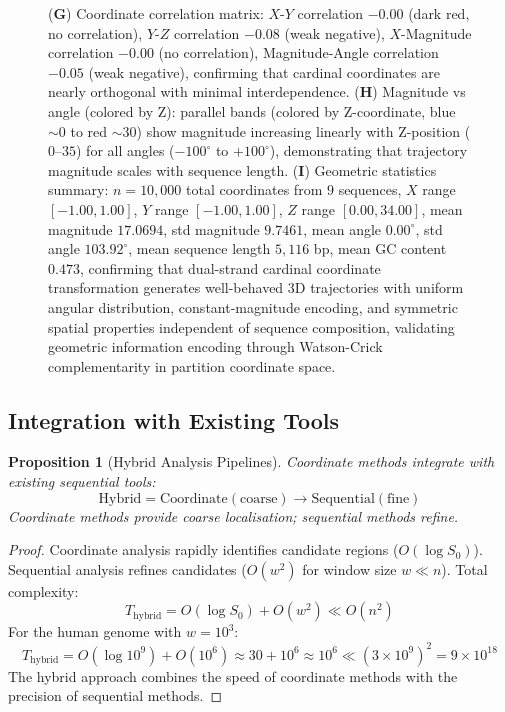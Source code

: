 \documentclass[11pt,a4paper]{article}
\newtheorem{proposition}[theorem]{Proposition}
\theoremstyle{remark}
\begin{document}
\begin{figure}[htbp]
{(\textbf{G}) Coordinate correlation matrix: $X$-$Y$ correlation $-0.00$ (dark red, no correlation), $Y$-$Z$ correlation $-0.08$ (weak negative), $X$-Magnitude correlation $-0.00$ (no correlation), Magnitude-Angle correlation $-0.05$ (weak negative), confirming that cardinal coordinates are nearly orthogonal with minimal interdependence. 
(\textbf{H}) Magnitude vs angle (colored by Z): parallel bands (colored by Z-coordinate, blue $\sim 0$ to red $\sim 30$) show magnitude increasing linearly with Z-position ($0$--$35$) for all angles ($-100^\circ$ to $+100^\circ$), demonstrating that trajectory magnitude scales with sequence length. 
(\textbf{I}) Geometric statistics summary: $n = 10{,}000$ total coordinates from $9$ sequences, $X$ range $[-1.00, 1.00]$, $Y$ range $[-1.00, 1.00]$, $Z$ range $[0.00, 34.00]$, mean magnitude $17.0694$, std magnitude $9.7461$, mean angle $0.00^\circ$, std angle $103.92^\circ$, mean sequence length $5{,}116$ bp, mean GC content $0.473$, confirming that dual-strand cardinal coordinate transformation generates well-behaved 3D trajectories with uniform angular distribution, constant-magnitude encoding, and symmetric spatial properties independent of sequence composition, validating geometric information encoding through Watson-Crick complementarity in partition coordinate space.}
\label{fig:dual_strand_geometry}
\end{figure}

\subsection{Integration with Existing Tools}

\begin{proposition}[Hybrid Analysis Pipelines]
\label{prop:hybrid_pipelines}
Coordinate methods integrate with existing sequential tools:
\begin{equation}
\text{Hybrid} = \text{Coordinate}(\text{coarse}) \to \text{Sequential}(\text{fine})
\end{equation}
Coordinate methods provide coarse localisation; sequential methods refine.
\end{proposition}

\begin{proof}
Coordinate analysis rapidly identifies candidate regions ($O(\log S_0)$). Sequential analysis refines candidates ($O(w^2)$ for window size $w \ll n$). Total complexity:
\begin{equation}
T_{\text{hybrid}} = O(\log S_0) + O(w^2) \ll O(n^2)
\end{equation}
For the human genome with $w = 10^3$:
\begin{equation}
T_{\text{hybrid}} = O(\log 10^9) + O(10^6) \approx 30 + 10^6 \approx 10^6 \ll (3 \times 10^9)^2 = 9 \times 10^{18}
\end{equation}
The hybrid approach combines the speed of coordinate methods with the precision of sequential methods.
\end{proof}
\end{document}
